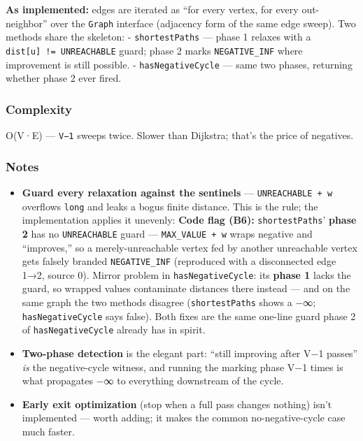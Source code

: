 \documentclass[
  10pt,
  letterpaper,
  onecolumn]{article}
\providecommand{\tightlist}{%
  \setlength{\itemsep}{0pt}\setlength{\parskip}{0pt}}
\begin{document}
\textbf{As implemented:} edges are iterated as ``for every vertex, for
every out-neighbor'' over the \texttt{Graph} interface (adjacency form
of the same edge sweep). Two methods share the skeleton: -
\texttt{shortestPaths} --- phase 1 relaxes with a
\texttt{dist{[}u{]}\ !=\ UNREACHABLE} guard; phase 2 marks
\texttt{NEGATIVE\_INF} where improvement is still possible. -
\texttt{hasNegativeCycle} --- same two phases, returning whether phase 2
ever fired.

\hypertarget{complexity-18}{%
\subsubsection{Complexity}\label{complexity-18}}

O(V·E) --- \texttt{V−1} sweeps twice. Slower than Dijkstra; that's the
price of negatives.

\hypertarget{notes-17}{%
\subsubsection{Notes}\label{notes-17}}

\begin{itemize}
\tightlist
\item
  \textbf{Guard every relaxation against the sentinels} ---
  \texttt{UNREACHABLE\ +\ w} overflows \texttt{long} and leaks a bogus
  finite distance. This is the rule; the implementation applies it
  unevenly: \textbf{Code flag (B6):} \texttt{shortestPaths}'
  \textbf{phase 2} has no \texttt{UNREACHABLE} guard ---
  \texttt{MAX\_VALUE\ +\ w} wraps negative and ``improves,'' so a
  merely-unreachable vertex fed by another unreachable vertex gets
  falsely branded \texttt{NEGATIVE\_INF} (reproduced with a disconnected
  edge 1→2, source 0). Mirror problem in \texttt{hasNegativeCycle}: its
  \textbf{phase 1} lacks the guard, so wrapped values contaminate
  distances there instead --- and on the same graph the two methods
  disagree (\texttt{shortestPaths} shows a −∞; \texttt{hasNegativeCycle}
  says false). Both fixes are the same one-line guard phase 2 of
  \texttt{hasNegativeCycle} already has in spirit.
\item
  \textbf{Two-phase detection} is the elegant part: ``still improving
  after V−1 passes'' \emph{is} the negative-cycle witness, and running
  the marking phase V−1 times is what propagates −∞ to everything
  downstream of the cycle.
\item
  \textbf{Early exit optimization} (stop when a full pass changes
  nothing) isn't implemented --- worth adding; it makes the common
  no-negative-cycle case much faster.
\end{itemize}
\end{document}
